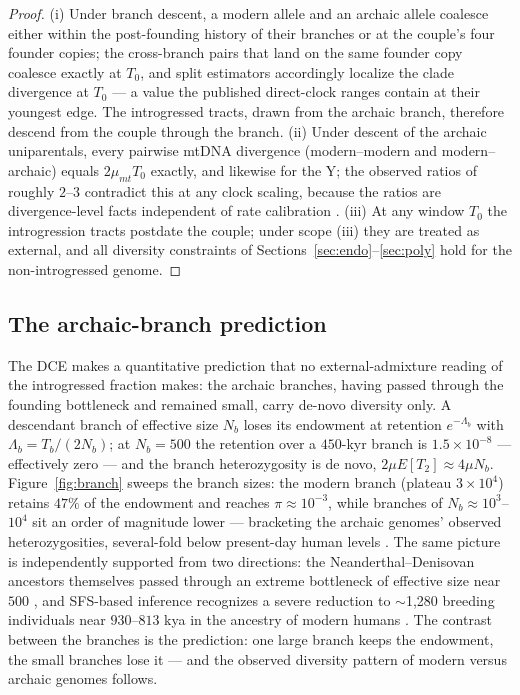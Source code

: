 \begin{proof}
(i) Under branch descent, a modern allele and an archaic allele coalesce
either within the post-founding history of their branches or at the couple's
four founder copies; the cross-branch pairs that land on the same founder
copy coalesce exactly at $T_0$, and split estimators accordingly localize
the clade divergence at $T_0$ --- a value the published direct-clock ranges
contain at their youngest edge. The introgressed tracts, drawn from the
archaic branch, therefore descend from the couple through the branch.
(ii) Under descent of the archaic uniparentals, every pairwise mtDNA
divergence (modern--modern and modern--archaic) equals $2\mu_{mt} T_0$
exactly, and likewise for the Y; the observed ratios of roughly $2$--$3$
contradict this at any clock scaling, because the ratios are
divergence-level facts independent of rate calibration
\citep{Green2008,Mendez2016}. (iii) At any window $T_0$ the introgression
tracts postdate the couple; under scope (iii) they are treated as external,
and all diversity constraints of Sections~\ref{sec:endo}--\ref{sec:poly}
hold for the non-introgressed genome.
\end{proof}

\subsection{The archaic-branch prediction}
The DCE makes a quantitative prediction that no external-admixture reading
of the introgressed fraction makes: the archaic branches, having passed
through the founding bottleneck and remained small, carry de-novo diversity
only. A descendant branch of effective size $N_b$ loses its endowment at
retention $e^{-\Lambda_b}$ with $\Lambda_b = T_b/(2N_b)$; at $N_b = 500$
the retention over a $450$-kyr branch is $1.5\times10^{-8}$ ---
effectively zero --- and the branch heterozygosity is de novo,
$2\mu E[T_2] \approx 4\mu N_b$. Figure~\ref{fig:branch} sweeps the branch
sizes: the modern branch (plateau $3\times10^4$) retains $47\%$ of the
endowment and reaches $\pi \approx 10^{-3}$, while branches of
$N_b \approx 10^3$--$10^4$ sit an order of magnitude lower ---
bracketing the archaic genomes' observed heterozygosities, several-fold
below present-day human levels \citep{Meyer2012,Pruefer2014}. The same
picture is independently supported from two directions: the
Neanderthal--Denisovan ancestors themselves passed through an extreme
bottleneck of effective size near $500$ \citep{Rogers2020}, and SFS-based
inference recognizes a severe reduction to $\sim$1,280 breeding
individuals near $930$--$813$ kya in the ancestry of modern humans
\citep{Hu2023}. The contrast between the branches is the prediction: one
large branch keeps the endowment, the small branches lose it --- and the
observed diversity pattern of modern versus archaic genomes follows.

